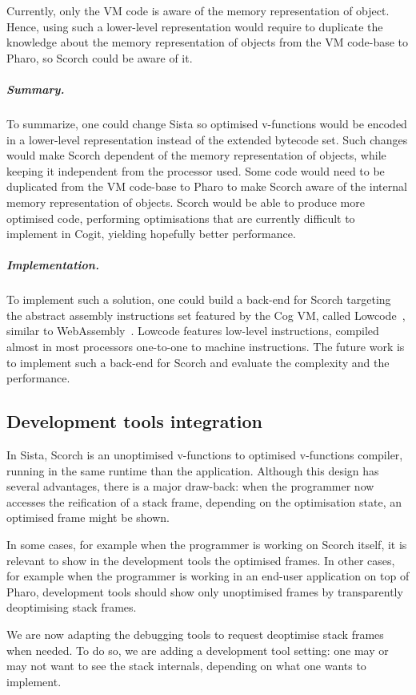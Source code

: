 \documentclass[a4paper,12pt,twoside]{../includes/ThesisStyle}
\begin{document}
Currently, only the VM code is aware of the memory representation of object. Hence, using such a lower-level representation would require to duplicate the knowledge about the memory representation of objects from the VM code-base to Pharo, so Scorch could be aware of it. 

\subparagraph{Summary.}To summarize, one could change Sista so optimised v-functions would be encoded in a lower-level representation instead of the extended bytecode set. Such changes would make Scorch dependent of the memory representation of objects, while keeping it independent from the processor used. Some code would need to be duplicated from the VM code-base to Pharo to make Scorch aware of the internal memory representation of objects. Scorch would be able to produce more optimised code, performing optimisations that are currently difficult to implement in Cogit, yielding hopefully better performance.

\subparagraph{Implementation.}To implement such a solution, one could build a back-end for Scorch targeting the abstract assembly instructions set featured by the Cog VM, called Lowcode~\cite{Salg16a}, similar to WebAssembly~\cite{WebAssembly}. Lowcode features low-level instructions, compiled almost in most processors one-to-one to machine instructions. The future work is to implement such a back-end for Scorch and evaluate the complexity and the performance.

\subsection{Development tools integration}
\label{ss:FWIDE}

In Sista, Scorch is an unoptimised v-functions to optimised v-functions compiler, running in the same runtime than the application. Although this design has several advantages, there is a major draw-back: when the programmer now accesses the reification of a stack frame, depending on the optimisation state, an optimised frame might be shown. 

In some cases, for example when the programmer is working on Scorch itself, it is relevant to show in the development tools the optimised frames. In other cases, for example when the programmer is working in an end-user application on top of Pharo, development tools should show only unoptimised frames by transparently deoptimising stack frames.

We are now adapting the debugging tools to request deoptimise stack frames when needed. To do so, we are adding a development tool setting: one may or may not want to see the stack internals, depending on what one wants to implement.
\end{document}
